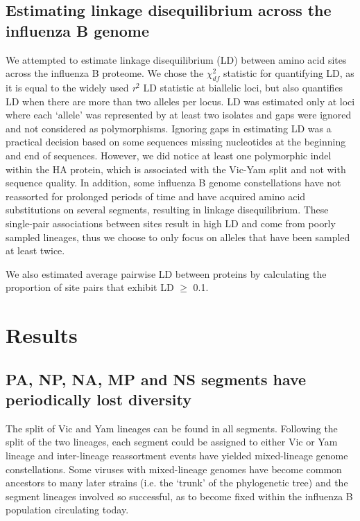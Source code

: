 \documentclass[11pt,oneside,letterpaper]{article}
\begin{document}
\subsection*{Estimating linkage disequilibrium across the influenza B genome}
We attempted to estimate linkage disequilibrium (LD) between amino acid sites across the influenza B proteome.
We chose the $\chi^{2}_{df}$ statistic \cite{zhao2005} for quantifying LD, as it is equal to the widely used \textit{r$^{2}$} LD statistic at biallelic loci, but also quantifies LD when there are more than two alleles per locus.
LD was estimated only at loci where each `allele' was represented by at least two isolates and gaps were ignored and not considered as polymorphisms.
Ignoring gaps in estimating LD was a practical decision based on some sequences missing nucleotides at the beginning and end of sequences.
However, we did notice at least one polymorphic indel within the HA protein, which is associated with the Vic-Yam split and not with sequence quality.
In addition, some influenza B genome constellations have not reassorted for prolonged periods of time and have acquired amino acid substitutions on several segments, resulting in linkage disequilibrium.
These single-pair associations between sites result in high LD and come from poorly sampled lineages, thus we choose to only focus on alleles that have been sampled at least twice.

We also estimated average pairwise LD between proteins by calculating the proportion of site pairs that exhibit LD $\geq$ 0.1.

\section*{Results}

\subsection*{PA, NP, NA, MP and NS segments have periodically lost diversity}
The split of Vic and Yam lineages can be found in all segments.
Following the split of the two lineages, each segment could be assigned to either Vic or Yam lineage and inter-lineage reassortment events have yielded mixed-lineage genome constellations.
Some viruses with mixed-lineage genomes have become common ancestors to many later strains (i.e. the `trunk' of the phylogenetic tree) and the segment lineages involved so successful, as to become fixed within the influenza B population circulating today.
\end{document}
